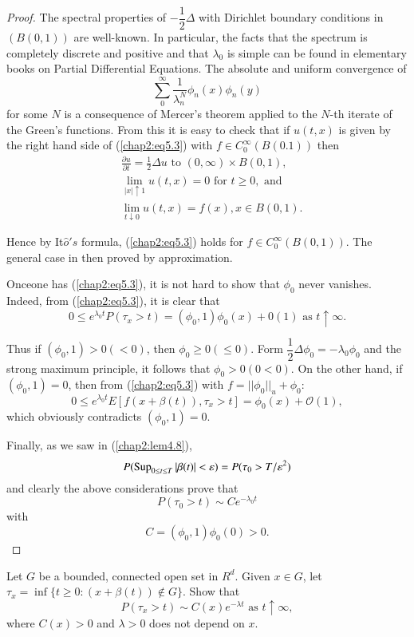 \begin{proof}
The spectral properties of $- \dfrac{1}{2} \Delta$ with Dirichlet
boundary conditions in $(B(0,1))$ are well-known. In particular, the
facts that the spectrum is completely discrete and positive and that
$\lambda_0$ is simple can be found in elementary books on Partial
Differential Equations. The absolute and uniform convergence of    
$$
\sum_{0}^\infty \frac{1}{\lambda_n^N} \phi_n(x) \phi_n(y)
$$
for some $N$ is a consequence of Mercer's theorem applied to the
$N$-th iterate of the Green's functions. From this it is easy to check
that if $u(t,x)$ is given by the right hand side of (\ref{chap2:eq5.3}) with $f
\in C^\infty_0(B(0.1))$ then   
\begin{align*}
&\frac{\partial u}{\partial t}= \frac{1}{2} \Delta u \text{ to } (0,
  \infty) \times B(0,1),\\ 
&\lim_{|x| \uparrow 1} u(t,x) =0 \text{ for } t \ge 0, \text{ and }\\ 
& \lim_{t \downarrow 0}u(t,x) = f(x), x \in B(0,1).
\end{align*}

Hence by It$\hat{o}'s$ formula, (\ref{chap2:eq5.3}) holds for $f \in
C^\infty_0(B(0,1))$. The general case in then proved by
approximation. 

Once\pageoriginale one has (\ref{chap2:eq5.3}), it is not hard to show
that $\phi_0$ 
never vanishes. Indeed, from (\ref{chap2:eq5.3}), it is clear that    
$$
0 \le e^{\lambda_0 t} P(\tau_x >t)= ( \phi_0, 1) \phi_0(x) +0(1)
\text{ as } t \uparrow \infty. 
$$

Thus if $(\phi_0, 1) > 0(<0)$, then $\phi_0 \ge 0( \le 0)$. Form
$\dfrac{1}{2} \Delta \phi_0=- \lambda_0 \phi_0$ and the strong maximum
principle, it follows that $\phi_0 >0 (0 < 0)$. On the other hand, if
$(\phi_0,1)=0$, then from (\ref{chap2:eq5.3}) with $f= || \phi_0 ||_u
+ \phi_0$:  
$$
0 \le e^{\lambda_0 t} E[f(x+ \beta(t)), \tau_x >t]= \phi_0(x)+ \mathcal{O}(1) , 
$$
which obviously contradicts $(\phi_0, 1)=0$. 

Finally, as we saw in (\ref{chap2:lem4.8}), 
$$
P(\operatorname{Sup}_{0 \le t \le T}|\beta(t)| < \varepsilon) = P(\tau_0 >
T/\varepsilon^2) 
$$
and clearly the above considerations prove that  
$$
P(\tau_0 >t)\sim C e^{-\lambda_0 t}  
$$
with 
$$
C=  (\phi_0,1) \phi_0(0) >0.  
$$
\end{proof}

\setcounter{exercise}{3}
\begin{exercise}%
Let $G$ be a bounded, connected open set in $R^d$. Given $x \in G$,
let $\tau_x = \inf \{ t \ge 0: (x + \beta(t))\notin G\}$. Show that  
$$
P(\tau_x >t) \sim  C(x) e^{-\lambda t} \text{ as } t \uparrow \infty,
$$
where $C(x) > 0$ and $\lambda > 0$ does not depend on $x$. 
\end{exercise}

